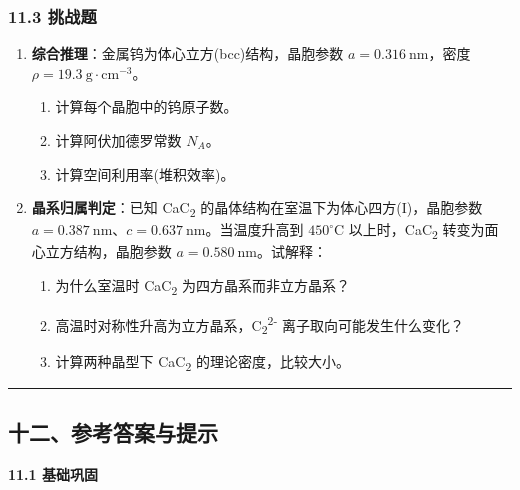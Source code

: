\subsubsection{11.3 挑战题}\label{ux6311ux6218ux9898}

\begin{enumerate}
\def\labelenumi{\arabic{enumi}.}
\setcounter{enumi}{6}
\tightlist
\item
  \textbf{综合推理}：金属钨为体心立方(bcc)结构，晶胞参数 \(a = 0.316\ \mathrm{nm}\)，密度 \(\rho = 19.3\ \mathrm{g\cdot cm^{-3}}\)。

  \begin{enumerate}
  \def\labelenumii{(\arabic{enumii})}
  \tightlist
  \item
    计算每个晶胞中的钨原子数。
  \item
    计算阿伏加德罗常数 \(N_A\)。
  \item
    计算空间利用率(堆积效率)。
  \end{enumerate}
\item
  \textbf{晶系归属判定}：已知 CaC\textsubscript{2} 的晶体结构在室温下为体心四方(I)，晶胞参数 \(a = 0.387\ \mathrm{nm}\)、\(c = 0.637\ \mathrm{nm}\)。当温度升高到 \(450^\circ\mathrm{C}\) 以上时，CaC\textsubscript{2} 转变为面心立方结构，晶胞参数 \(a = 0.580\ \mathrm{nm}\)。试解释：

  \begin{enumerate}
  \def\labelenumii{(\arabic{enumii})}
  \tightlist
  \item
    为什么室温时 CaC\textsubscript{2} 为四方晶系而非立方晶系？
  \item
    高温时对称性升高为立方晶系，C\textsubscript{2}\textsuperscript{2-} 离子取向可能发生什么变化？
  \item
    计算两种晶型下 CaC\textsubscript{2} 的理论密度，比较大小。
  \end{enumerate}
\end{enumerate}

\begin{center}\rule{0.5\linewidth}{0.5pt}\end{center}

\subsection{十二、参考答案与提示}\label{ux5341ux4e8cux53c2ux8003ux7b54ux6848ux4e0eux63d0ux793a}

\textbf{11.1 基础巩固}

